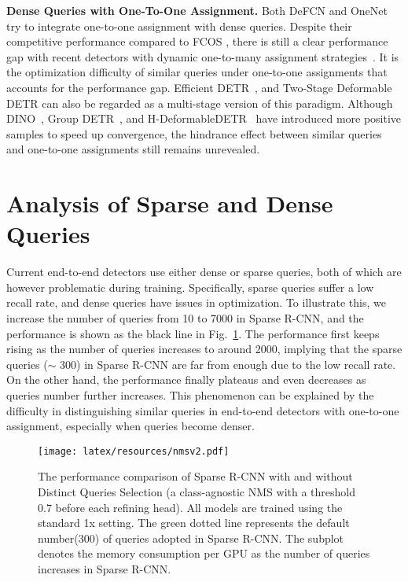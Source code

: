 \documentclass[10pt,twocolumn,letterpaper]{article}
\begin{document}
\noindent\textbf{Dense Queries with One-To-One Assignment.} Both DeFCN \cite{wang2021end} and OneNet \cite{sun2021makes} try to integrate one-to-one assignment with dense queries. Despite their competitive performance compared to FCOS \cite{tian2019fcos}, there is still a clear performance gap with recent detectors with dynamic one-to-many assignment strategies~\cite{kim2020probabilistic, zhu2020autoassign, ge2021ota, feng2021tood, li2022dual}. It is the optimization difficulty of similar queries under one-to-one assignments that accounts for the performance gap. Efficient DETR~\cite{yao2021efficient}, and Two-Stage Deformable DETR \cite{zhu2020deformable} can also be regarded as a multi-stage version of this paradigm. Although DINO~\cite{zhang2022dino}, Group DETR~\cite{chen2022group}, and H-DeformableDETR~\cite{jia2022detrs} have introduced more positive samples to speed up convergence, the hindrance effect between similar queries and one-to-one assignments still remains unrevealed. \section{Analysis of Sparse and Dense Queries}

Current end-to-end detectors use either dense or sparse queries, both of which are however problematic during training. 
Specifically, sparse queries suffer a low recall rate, and dense queries have issues in optimization. To illustrate this, we increase the number of queries from 10 to 7000 in Sparse R-CNN, and the performance is shown as the black line in Fig.~\ref{fig:nms}. The performance first keeps rising as the number of queries increases to around 2000, implying that the sparse queries ($\sim$ 300) in Sparse R-CNN are far from enough due to the low recall rate.  On the other hand, the performance finally plateaus and even decreases as queries number further increases. This phenomenon can be explained by the difficulty in distinguishing similar queries in end-to-end detectors with one-to-one assignment, especially when queries become denser. 

\begin{figure}[!h]
\centering
\texttt{[image: latex/resources/nmsv2.pdf]}

\caption{The performance comparison of Sparse R-CNN with and without Distinct Queries Selection (a class-agnostic NMS with a threshold 0.7 before each refining head). All models are trained using the standard 1x setting. The green dotted line represents the default number(300) of queries adopted in Sparse R-CNN. The subplot denotes the memory consumption per GPU as the number of queries increases in Sparse R-CNN. 
}
\vspace{-5mm}
\label{fig:nms}
\end{figure}
\label{sec.distincness}
\end{document}
